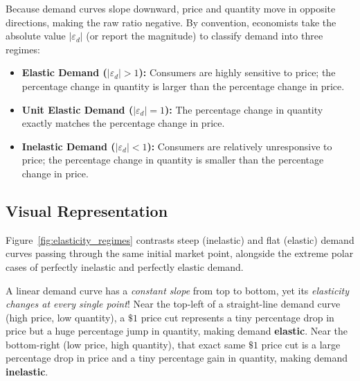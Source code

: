 \documentclass[11pt,letterpaper]{article}
\begin{document}
Because demand curves slope downward, price and quantity move in opposite directions, making the raw ratio negative. By convention, economists take the absolute value $|\varepsilon_d|$ (or report the magnitude) to classify demand into three regimes:
\begin{itemize}
    \item \textbf{Elastic Demand ($|\varepsilon_d| > 1$):} Consumers are highly sensitive to price; the percentage change in quantity is larger than the percentage change in price.
    \item \textbf{Unit Elastic Demand ($|\varepsilon_d| = 1$):} The percentage change in quantity exactly matches the percentage change in price.
    \item \textbf{Inelastic Demand ($|\varepsilon_d| < 1$):} Consumers are relatively unresponsive to price; the percentage change in quantity is smaller than the percentage change in price.
\end{itemize}

\subsection*{Visual Representation}
Figure~\ref{fig:elasticity_regimes} contrasts steep (inelastic) and flat (elastic) demand curves passing through the same initial market point, alongside the extreme polar cases of perfectly inelastic and perfectly elastic demand.

\begin{tcolorbox}[colback=CourseAmber!12!white,colframe=CourseOrange,title=\textbf{Clear It Up: Slope Is Not the Same as Elasticity}]
A linear demand curve has a \emph{constant slope} from top to bottom, yet its \emph{elasticity changes at every single point}! Near the top-left of a straight-line demand curve (high price, low quantity), a $\$1$ price cut represents a tiny percentage drop in price but a huge percentage jump in quantity, making demand \textbf{elastic}. Near the bottom-right (low price, high quantity), that exact same $\$1$ price cut is a large percentage drop in price and a tiny percentage gain in quantity, making demand \textbf{inelastic}.
\end{tcolorbox}
\end{document}
